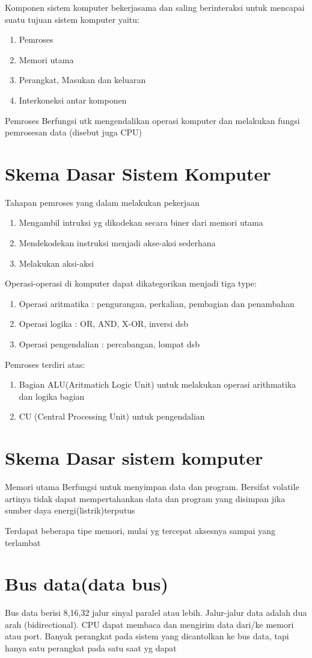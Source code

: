 Komponen sistem komputer bekerjasama dan saling berinteraksi untuk mencapai suatu tujuan sistem komputer yaitu:

\begin{enumerate}
\item Pemroses
\item Memori utama
\item Perangkat, Masukan dan keluaran
\item Interkoneksi antar komponen
\end{enumerate}


Pemroses
Berfungsi utk mengendalikan operasi komputer dan melakukan fungsi pemrosesan data (disebut juga CPU)


\section{Skema Dasar Sistem Komputer}
Tahapan pemroses yang dalam melakukan pekerjaan
\begin{enumerate}
\item Mengambil intruksi yg dikodekan secara biner dari memori utama
\item Mendekodekan instruksi menjadi akse-aksi sederhana
\item Melakukan aksi-aksi
\end{enumerate}

Operasi-operasi di komputer dapat dikategorikan menjadi tiga type:
\begin{enumerate}
\item Operasi aritmatika : pengurangan, perkalian, pembagian dan penambahan
\item Operasi logika : OR, AND, X-OR, inversi dsb
\item Operasi pengendalian : percabangan, lompat dsb
\end{enumerate}

Pemroses terdiri atas:
\begin{enumerate}
\item Bagian ALU(Aritmatich Logic Unit) untuk melakukan operasi arithmatika dan logika bagian
\item CU (Central Processing Unit) untuk pengendalian 
\end{enumerate}

\section{Skema Dasar sistem komputer}
Memori utama
Berfungsi untuk menyimpan data dan program. Bersifat volatile artinya tidak dapat mempertahankan data dan program yang disimpan jika sumber daya energi(listrik)terputus

Terdapat beberapa tipe memori, mulai yg tercepat aksesnya sampai yang terlambat

\section{Bus data(data bus)}
Bus data berisi 8,16,32 jalur sinyal paralel atau lebih. Jalur-jalur data adalah dua arah (bidirectional). CPU dapat membaca dan mengirim data dari/ke memori atau port. 
Banyak perangkat pada sistem yang dicantolkan ke bus data, tapi hanya satu perangkat pada satu saat yg dapat

